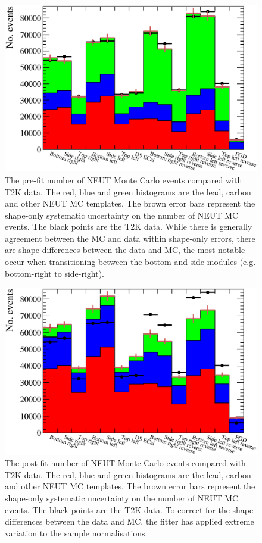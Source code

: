 \begin{figure}[b!]
  \centering
  \includegraphics[width=15cm]{images/measurement/data/MCTemplatesWithSystematics_T2KData_PreFit.eps}
  \caption{The pre-fit number of NEUT Monte Carlo events compared with T2K data.  The red, blue and green histograms are the lead, carbon and other NEUT MC templates.  The brown error bars represent the shape-only systematic uncertainty on the number of NEUT MC events.  The black points are the T2K data.  While there is generally agreement between the MC and data within shape-only errors, there are shape differences between the data and MC, the most notable occur when transitioning between the bottom and side modules (e.g. bottom-right to side-right).}
  \label{fig:MCTemplatesWithSystematicsT2KDataPreFit}
\end{figure}
\begin{figure}
  \centering
  \includegraphics[width=15cm]{images/measurement/data/MCTemplatesWithSystematics_T2KData_PostFit.eps}
  \caption{The post-fit number of NEUT Monte Carlo events compared with T2K data.  The red, blue and green histograms are the lead, carbon and other NEUT MC templates.  The brown error bars represent the shape-only systematic uncertainty on the number of NEUT MC events.  The black points are the T2K data.  To correct for the shape differences between the data and MC, the fitter has applied extreme variation to the sample normalisations.}
  \label{fig:MCTemplatesWithSystematicsT2KDataPostFit}
\end{figure}
